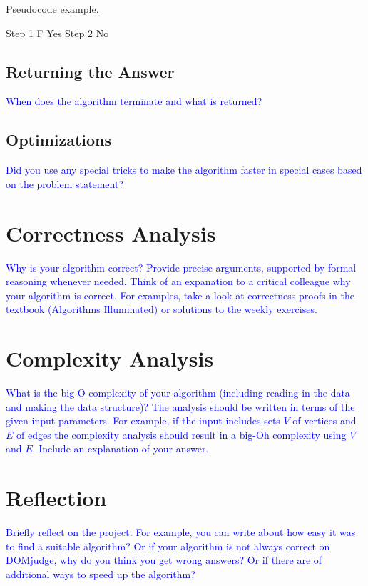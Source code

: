 \documentclass[a4paper]{article}
\newcommand{\instruction}[1]{\textcolor{blue}{#1}}
\begin{document}
\begin{algorithm}[h!]
    \caption{Pseudocode example.}
    \label{pseudocode}
    \begin{algorithmic}[1]
    \State Step 1
     F
    \State \Return Yes
    \Else 
    \State Step 2
    \EndIf
    \EndWhile 
    \State \Return No
    \EndFunction
    \end{algorithmic}
    \end{algorithm}

\subsection{Returning the Answer}
\instruction{When does the algorithm terminate and what is returned?}

\subsection{Optimizations}
\instruction{Did you use any special tricks to make the algorithm faster in special cases based on the problem statement?}

\section{Correctness Analysis}
\instruction{Why is your algorithm correct? Provide precise arguments, supported by formal reasoning whenever needed. Think of an expanation to a critical colleague why your algorithm is correct. For examples, take a look at correctness proofs in the textbook (Algorithms Illuminated) or solutions to the weekly exercises.}


\section{Complexity Analysis}
\instruction{What is the big O complexity of your algorithm (including reading in the data and making the data structure)? The analysis should be written in terms of the given input parameters. For example, if the input includes sets $V$ of vertices and $E$ of edges the complexity analysis should result in a big-Oh complexity using $V$ and $E$. Include an explanation of your answer.} 


\section{Reflection}
\instruction{Briefly reflect on the project. For example, you can write about how easy it was to find a suitable algorithm? Or if your algorithm is not always correct on DOMjudge, why do you think you get wrong answers? Or if there are of additional ways to speed up the algorithm?}
\end{document}
